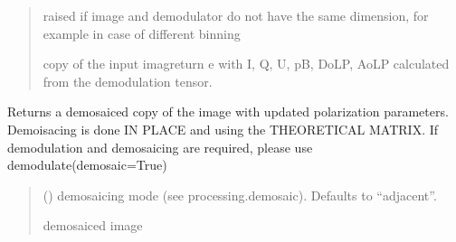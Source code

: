 \documentclass[letterpaper,10pt,english]{sphinxmanual}
\begin{document}
\begin{fulllineitems}
\begin{fulllineitems}
\begin{quote}
\begin{description}
\begin{itemize}
\end{itemize}

\sphinxAtStartPar
{} \textendash{} raised if image and demodulator do not have the same dimension, for example in case of different binning

\sphinxAtStartPar
copy of the input imagreturn e with I, Q, U, pB, DoLP, AoLP calculated from the demodulation tensor.

\sphinxAtStartPar
{\hyperref[\detokenize{micropolarray:micropolarray.micropol_image.MicropolImage}]{}}

\end{description}\end{quote}

\end{fulllineitems}


\begin{fulllineitems}
\label{\detokenize{micropolarray:micropolarray.micropol_image.MicropolImage.demosaic}}
\pysigstartsignatures
{}
\pysigstopsignatures
\sphinxAtStartPar
Returns a demosaiced copy of the image with updated polarization parameters. Demoisacing is done IN PLACE and
using the THEORETICAL MATRIX. If demodulation and demosaicing are required, please use demodulate(demosaic=True)
\begin{quote}\begin{description}
\sphinxAtStartPar
{} (\sphinxstyleliteralemphasis{\sphinxupquote{, }}) \textendash{} demosaicing mode (see processing.demosaic). Defaults to “adjacent”.

\sphinxAtStartPar
demosaiced image

\sphinxAtStartPar
{\hyperref[\detokenize{micropolarray:micropolarray.micropol_image.MicropolImage}]{}}


\end{description}
\end{quote}
\end{fulllineitems}
\end{fulllineitems}
\end{document}
